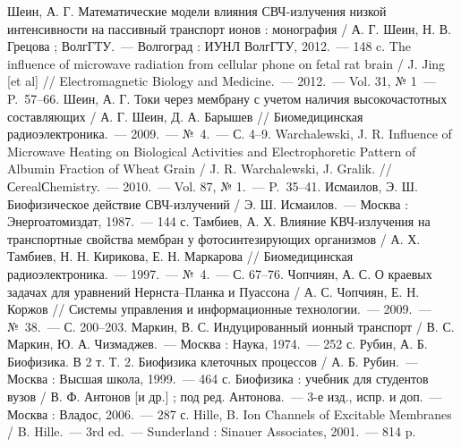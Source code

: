 \pagestyle{empty}
\def\bibname{СПИСОК ИСПОЛЬЗОВАННЫХ ИСТОЧНИКОВ}
\begin{thebibliography}{99}
 Шеин, А. Г. Математические модели влияния СВЧ-излучения низкой
    интенсивности на пассивный транспорт ионов : монография / А. Г. Шеин, Н. В.
    Грецова ; ВолгГТУ.~--- Волгоград : ИУНЛ ВолгГТУ, 2012.~--- 148 c.
 The influence of microwave radiation from cellular phone on
    fetal rat brain / J. Jing [et al] // Electromagnetic Biology and
    Medicine.~--- 2012.~--- Vol. 31, № 1~--- P.~57--66.
 Шеин, А. Г. Токи через мембрану с учетом наличия высокочастотных
    составляющих / А. Г. Шеин, Д. А. Барышев // Биомедицинская радиоэлектроника.~---
    2009.~--- №~4.~--- С. 4--9.
 Warchalewski, J. R. Influence of Microwave
    Heating on Biological Activities and Electrophoretic Pattern of
    Albumin Fraction of Wheat Grain /  J. R. Warchalewski, J. Gralik. //
    СerealСhemistry.~--- 2010.~--- Vol. 87, № 1.~--- P.~35--41.
 Исмаилов, Э. Ш. Биофизическое действие СВЧ-излучений / Э. Ш.
    Исмаилов.~--- Москва : Энергоатомиздат, 1987.~--- 144 с.
 Тамбиев, А. Х. Влияние КВЧ-излучения на транспортные свойства
    мембран у фотосинтезирующих организмов / А. Х. Тамбиев, Н. Н. Кирикова,
    Е. Н. Маркарова // Биомедицинская радиоэлектроника.~--- 1997.~--- №~4.~--- С.
    67--76.
 Чопчиян, А. С. О краевых задачах для уравнений Нернста--Планка
    и Пуассона / А. С. Чопчиян, Е. Н. Коржов // Системы управления и
    информационные технологии.~--- 2009.~--- №~38.~--- С. 200--203.
 Маркин, В. С. Индуцированный ионный транспорт / В. С. Маркин,
    Ю. А. Чизмаджев.~--- Москва : Наука, 1974.~--- 252 с.
 Рубин, А. Б. Биофизика. В 2 т. Т. 2. Биофизика клеточных
    процессов / А. Б. Рубин.~--- Москва : Высшая школа, 1999.~--- 464 с.
 Биофизика : учебник для студентов вузов / В. Ф. Антонов [и др.] ;
    под ред. Антонова.~--- 3-е изд., испр. и доп.~--- Москва : Владос, 2006.~--- 287 с.
 Hille, B. Ion Channels of Excitable Membranes / B.
    Hille.~--- 3rd ed.~--- Sunderland : Sinauer Associates, 2001.~--- 814 p.


\end{thebibliography}
